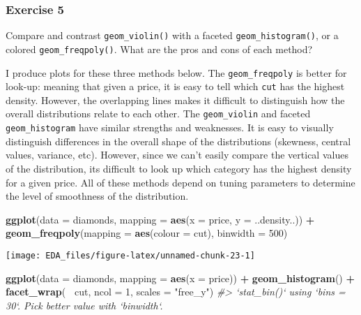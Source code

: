 \documentclass[]{book}
\newenvironment{Shaded}{\begin{snugshade}}{\end{snugshade}}
\newcommand{\CommentTok}[1]{\textcolor[rgb]{0.56,0.35,0.01}{\textit{#1}}}
\newcommand{\DataTypeTok}[1]{\textcolor[rgb]{0.13,0.29,0.53}{#1}}
\newcommand{\DecValTok}[1]{\textcolor[rgb]{0.00,0.00,0.81}{#1}}
\newcommand{\KeywordTok}[1]{\textcolor[rgb]{0.13,0.29,0.53}{\textbf{#1}}}
\newcommand{\NormalTok}[1]{#1}
\newcommand{\OperatorTok}[1]{\textcolor[rgb]{0.81,0.36,0.00}{\textbf{#1}}}
\newcommand{\StringTok}[1]{\textcolor[rgb]{0.31,0.60,0.02}{#1}}
\theoremstyle{plain}
\theoremstyle{remark}
\theoremstyle{definition}
\theoremstyle{definition}
\theoremstyle{definition}
\theoremstyle{remark}
\begin{document}
\hypertarget{exercise-5-6}{%
\subsubsection{Exercise 5}\label{exercise-5-6}}

Compare and contrast \texttt{geom\_violin()} with a faceted
\texttt{geom\_histogram()}, or a colored \texttt{geom\_freqpoly()}. What
are the pros and cons of each method?

I produce plots for these three methods below. The
\texttt{geom\_freqpoly} is better for look-up: meaning that given a
price, it is easy to tell which \texttt{cut} has the highest density.
However, the overlapping lines makes it difficult to distinguish how the
overall distributions relate to each other. The \texttt{geom\_violin}
and faceted \texttt{geom\_histogram} have similar strengths and
weaknesses. It is easy to visually distinguish differences in the
overall shape of the distributions (skewness, central values, variance,
etc). However, since we can't easily compare the vertical values of the
distribution, its difficult to look up which category has the highest
density for a given price. All of these methods depend on tuning
parameters to determine the level of smoothness of the distribution.

\begin{Shaded}
\begin{Highlighting}[]
\KeywordTok{ggplot}\NormalTok{(}\DataTypeTok{data =}\NormalTok{ diamonds, }\DataTypeTok{mapping =} \KeywordTok{aes}\NormalTok{(}\DataTypeTok{x =}\NormalTok{ price, }\DataTypeTok{y =}\NormalTok{ ..density..)) }\OperatorTok{+}
\StringTok{  }\KeywordTok{geom_freqpoly}\NormalTok{(}\DataTypeTok{mapping =} \KeywordTok{aes}\NormalTok{(}\DataTypeTok{colour =}\NormalTok{ cut), }\DataTypeTok{binwidth =} \DecValTok{500}\NormalTok{)}
\end{Highlighting}
\end{Shaded}

\begin{center}\texttt{[image: EDA\_files/figure-latex/unnamed-chunk-23-1]} \end{center}

\begin{Shaded}
\begin{Highlighting}[]
\KeywordTok{ggplot}\NormalTok{(}\DataTypeTok{data =}\NormalTok{ diamonds, }\DataTypeTok{mapping =} \KeywordTok{aes}\NormalTok{(}\DataTypeTok{x =}\NormalTok{ price)) }\OperatorTok{+}
\StringTok{  }\KeywordTok{geom_histogram}\NormalTok{() }\OperatorTok{+}
\StringTok{  }\KeywordTok{facet_wrap}\NormalTok{(}\OperatorTok{~}\StringTok{ }\NormalTok{cut, }\DataTypeTok{ncol =} \DecValTok{1}\NormalTok{, }\DataTypeTok{scales =} \StringTok{"free_y"}\NormalTok{)}
\CommentTok{#> `stat_bin()` using `bins = 30`. Pick better value with `binwidth`.}
\end{Highlighting}
\end{Shaded}
\end{document}
